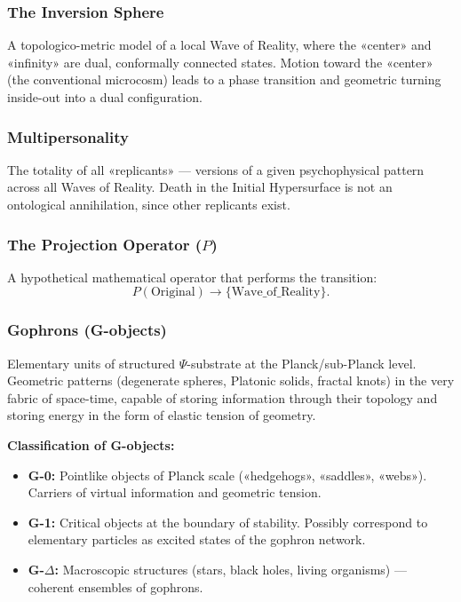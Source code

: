 \documentclass[a4paper,12pt]{article}
\begin{document}
	\subsubsection{The Inversion Sphere}
	
	A topologico-metric model of a local Wave of Reality, where the «center» and «infinity» are dual, conformally connected states. Motion toward the «center» (the conventional microcosm) leads to a phase transition and geometric turning inside-out into a dual configuration.
	
	\subsubsection{Multipersonality}
	
	The totality of all «replicants» — versions of a given psychophysical pattern across all Waves of Reality. Death in the Initial Hypersurface is not an ontological annihilation, since other replicants exist.
	
	\subsubsection{The Projection Operator ($P$)}
	
	A hypothetical mathematical operator that performs the transition:
	\[
	P(\text{Original}) \to \{\text{Wave\_of\_Reality}\}.
	\]
	
	\subsubsection{Gophrons (G-objects)}
	
	Elementary units of structured $\Psi$-substrate at the Planck/sub-Planck level. Geometric patterns (degenerate spheres, Platonic solids, fractal knots) in the very fabric of space-time, capable of storing information through their topology and storing energy in the form of elastic tension of geometry.
	
	\textbf{Classification of G-objects:}
	\begin{itemize}
		\item \textbf{G-0:} Pointlike objects of Planck scale («hedgehogs», «saddles», «webs»). Carriers of virtual information and geometric tension.
		\item \textbf{G-1:} Critical objects at the boundary of stability. Possibly correspond to elementary particles as excited states of the gophron network.
		\item \textbf{G-$\Delta$:} Macroscopic structures (stars, black holes, living organisms) — coherent ensembles of gophrons.
	\end{itemize}
	
\end{document}
